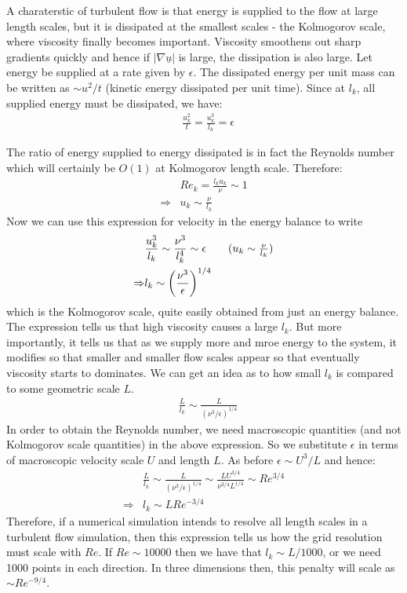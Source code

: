 \documentclass[11pt,a4paper]{article}
\newcommand{\e}{\epsilon}
\newcommand{\vu}{\underline{u}}
\newcommand{\1}{\vect{1}}
\newcommand{\grad}{\nabla}
\newcommand{\RA}{\Rightarrow}
\begin{document}
A charaterstic of turbulent flow is that energy is supplied to the flow at large length scales, but it is dissipated at the smallest scales - the Kolmogorov scale, where viscosity finally becomes important. Viscosity smoothens out sharp gradients quickly and hence if $|\grad\vu|$ is large, the dissipation is also large. Let energy be supplied at a rate given by $\e$. The dissipated energy per unit mass can be written as $\sim u^2/t$ (kinetic energy dissipated per unit time). Since at $l_k$, all supplied energy must be dissipated, we have:
\begin{align*}
&\frac{u_k^2}{t} = \frac{u_k^3}{l_k} = \e
\end{align*}

The ratio of energy supplied to energy dissipated is in fact the Reynolds number which will certainly be $O(1)$ at Kolmogorov length scale. Therefore:
\begin{align*}
&Re_k = \frac{l_k u_k}{\nu} \sim 1\\
\RA&u_k \sim \frac{\nu}{l_k}
\end{align*}
Now we can use this expression for velocity in the energy balance to write
\begin{align*}
&\frac{u_k^3}{l_k} \sim \frac{\nu^3}{l_k^4} \sim \e \tag{$u_k \sim \frac{\nu}{l_k}$}\\
\RA&l_k \sim \bigg(\frac{\nu^3}{\e}\bigg)^{1/4}
\end{align*}
which is the Kolmogorov scale, quite easily obtained from just an energy balance. The expression tells us that high viscosity causes a large $l_k$. But more importantly, it tells us that as we supply more and mroe energy to the system, it modifies so that smaller and smaller flow scales appear so that eventually viscosity starts to dominates. We can get an idea as to how small $l_k$ is compared to some geometric scale $L$. 
\begin{align*}
&\frac{L}{l_k} \sim \frac{L}{(\nu^3/\e)^{1/4}}
\end{align*}
In order to obtain the Reynolds number, we need macroscopic quantities (and not Kolmogorov scale quantities) in the above expression. So we substitute $\e$ in terms of macroscopic velocity scale $U$ and length $L$. As before $\e\sim U^3/L$ and hence:
\begin{align*}
&\frac{L}{l_k} \sim \frac{L}{(\nu^3/\e)^{1/4}} \sim \frac{L U^{3/4}}{\nu^{3/4}L^{1/4}} \sim Re^{3/4}\\
\RA& l_k \sim L Re^{-3/4}
\end{align*}
Therefore, if a numerical simulation intends to resolve all length scales in a turbulent flow simulation, then this expression tells us how the grid resolution must scale with $Re$. If $Re\sim 10000$ then we have that $l_k \sim L/1000$, or we need 1000 points in each direction. In three dimensions then, this penalty will scale as $\sim Re^{-9/4}$. 
\end{document}
